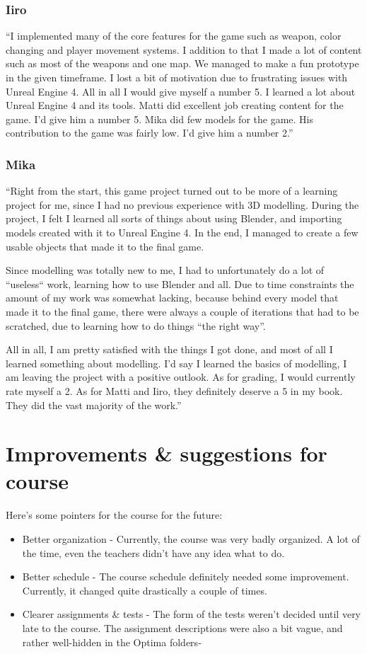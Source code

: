 \documentclass[
  oneside,
  11pt, a4paper,
  footinclude=true,
  headinclude=true,
  cleardoublepage=empty
]{scrbook}
\begin{document}
\subsection{Iiro}
``I implemented many of the core features for the game such as weapon, color changing and player movement systems. I addition to that I made a lot of content such as most of the weapons and one map. We managed to make a fun prototype in the given timeframe. I lost a bit of motivation due to frustrating issues with Unreal Engine 4. All in all I would give myself a number 5. I learned a lot about Unreal Engine 4 and its tools.
\medskip
Matti did excellent job creating content for the game. I'd give him a number 5. Mika did few models for the game. His contribution to the game was fairly low. I'd give him a number 2.''

\subsection{Mika}

``Right from the start, this game project turned out to be more of a learning project for me, since I had no previous experience with 3D modelling. During the project, I felt I learned all sorts of things about using Blender, and importing models created with it to Unreal Engine 4. In the end, I managed to create a few usable objects that made it to the final game.

\medskip
Since modelling was totally new to me, I had to unfortunately do a lot of “useless“ work, learning how to use Blender and all. Due to time constraints the amount of my work was somewhat lacking, because behind every model that made it to the final game, there were always a couple of iterations that had to be scratched, due to learning how to do things “the right way”.

\medskip
All in all, I am pretty satisfied with the things I got done, and most of all I learned something about modelling. I’d say I learned the basics of modelling, I am leaving the project with a positive outlook. As for grading, I would currently rate myself a 2. As for Matti and Iiro, they definitely deserve a 5 in my book. They did the vast majority of the work.''

\chapter{Improvements \& suggestions for course}
Here's some pointers for the course for the future:
\begin{itemize}
\item Better organization - Currently, the course was very badly organized. A lot of the time, even the teachers didn't have any idea what to do.

\item Better schedule - The course schedule definitely needed some improvement. Currently, it changed quite drastically a couple of times.

\item Clearer assignments \& tests - The form of the tests weren't decided until very late to the course. The assignment descriptions were also a bit vague, and rather well-hidden in the Optima folders-
\end{itemize}
\end{document}

